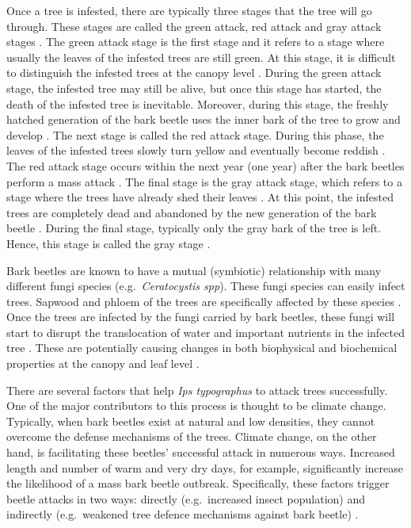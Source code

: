 \documentclass[a4paper, twoside]{templates/ociamthesis}
\begin{document}
Once a tree is infested, there are typically three stages that the tree will go through. These stages are called the green attack, red attack and gray attack stages \citep{sprintsin2011combining}. The green attack stage is the first stage and it refers to a stage where usually the leaves of the infested trees are still green. At this stage, it is difficult to distinguish the infested trees at the canopy level \citep{wulder2006estimating}. During the green attack stage, the infested tree may still be alive, but once this stage has started, the death of the infested tree is inevitable. Moreover, during this stage, the freshly hatched generation of the bark beetle uses the inner bark of the tree to grow and develop \citep{niemann2005assessment}. The next stage is called the red attack stage. During this phase, the leaves of the infested trees slowly turn yellow and eventually become reddish \citep{fernandez2020monitoring}. The red attack stage occurs within the next year (one year) after the bark beetles perform a mass attack \citep{niemann2005assessment}. The final stage is the gray attack stage, which refers to a stage where the trees have already shed their leaves \citep{wulder2009challenges}. At this point, the infested trees are completely dead and abandoned by the new generation of the bark beetle \citep{niemann2005assessment}. During the final stage, typically only the gray bark of the tree is left. Hence, this stage is called the gray stage \citep{abdullah2019sensitivity}.

Bark beetles are known to have a mutual (symbiotic) relationship with many different fungi species (e.g.~\emph{Ceratocystis spp}). These fungi species can easily infect trees. Sapwood and phloem of the trees are specifically affected by these species \citep{niemann2005assessment, six2003genetic}. Once the trees are infected by the fungi carried by bark beetles, these fungi will start to disrupt the translocation of water and important nutrients in the infected tree \citep{paine1997interactions, wermelinger2004ecology}. These are potentially causing changes in both biophysical and biochemical properties at the canopy and leaf level \citep{abdullah2018european}.

There are several factors that help \emph{Ips typographus} to attack trees successfully. One of the major contributors to this process is thought to be climate change. Typically, when bark beetles exist at natural and low densities, they cannot overcome the defense mechanisms of the trees. Climate change, on the other hand, is facilitating these beetles' successful attack in numerous ways. Increased length and number of warm and very dry days, for example, significantly increase the likelihood of a mass bark beetle outbreak. Specifically, these factors trigger beetle attacks in two ways: directly (e.g.~increased insect population) and indirectly (e.g.~weakened tree defence mechanisms against bark beetle) \citep{bale2002herbivory, bentz2015modeling, marini2017climate}.
\end{document}

